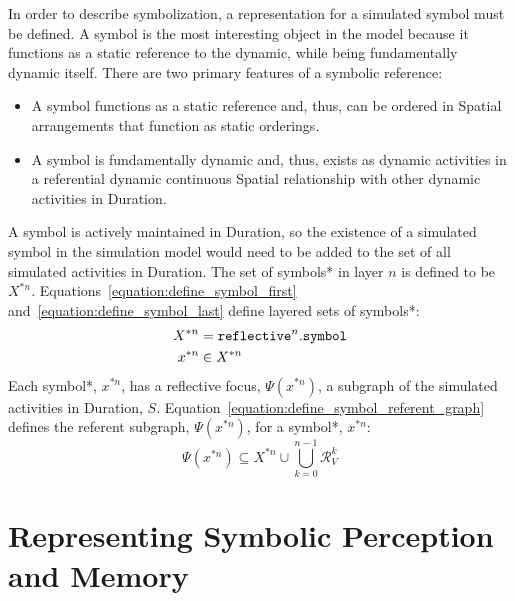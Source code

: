 In order to describe symbolization, a representation for a simulated
symbol must be defined.  A symbol is the most interesting object in
the model because it functions as a static reference to the dynamic,
while being fundamentally dynamic itself.  There are two primary
features of a symbolic reference:
\begin{itemize}
\item A symbol functions as a static reference and, thus, can be
  ordered in Spatial arrangements that function as static orderings.
\item A symbol is fundamentally dynamic and, thus, exists as dynamic
  activities in a referential dynamic continuous Spatial relationship
  with other dynamic activities in Duration.
\end{itemize}
A symbol is actively maintained in Duration, so the existence of a
simulated symbol in the simulation model would need to be added to the
set of all simulated activities in Duration.  The set of symbols* in
layer $n$ is defined to be $X^{*n}$.
{\mbox{Equations~\ref{equation:define_symbol_first}}}
{\mbox{and~\ref{equation:define_symbol_last}}} define layered sets of
symbols*:
\begin{align}
\label{equation:define_symbol_first}
           X^{*n} &= \text{\tt{reflective}}^n.\text{\tt{symbol}} \\
\label{equation:define_symbol_last}
           x^{*n} &\in X^{*n}
\end{align}
Each symbol*, $x^{*n}$, has a reflective focus, $\Psi(x^{*n})$, a
subgraph of the simulated activities in Duration, $S$.
{\mbox{Equation~\ref{equation:define_symbol_referent_graph}}} defines
the referent subgraph, $\Psi(x^{*n})$, for a symbol*, $x^{*n}$:
\begin{equation}
\label{equation:define_symbol_referent_graph}
  \Psi(x^{*n}) \subseteq X^{*n} \cup \bigcup_{k=0}^{n-1}\mathcal{R}^k_V
\end{equation}

\section{Representing Symbolic Perception and Memory}

